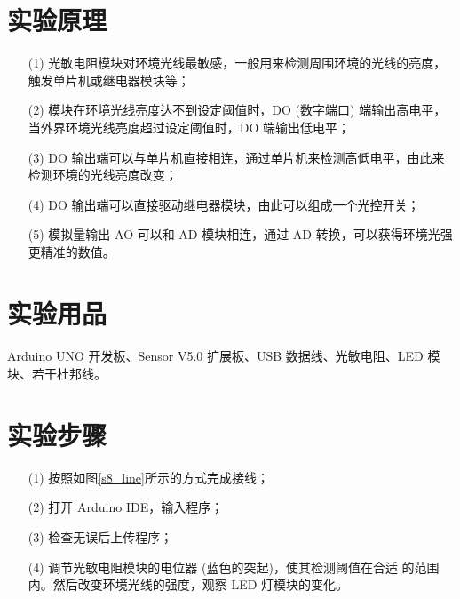 \documentclass[UTF8, oneside]{ctexbook}
\begin{document}
\section{实验原理}
\begin{itemize}
    \item[(1)] 光敏电阻模块对环境光线最敏感，一般用来检测周围环境的光线的亮度，触发单片机或继电器模块等；
    \item[(2)] 模块在环境光线亮度达不到设定阈值时，DO (数字端口) 端输出高电平，当外界环境光线亮度超过设定阈值时，DO 端输出低电平；
    \item[(3)] DO 输出端可以与单片机直接相连，通过单片机来检测高低电平，由此来检测环境的光线亮度改变；
    \item[(4)] DO 输出端可以直接驱动继电器模块，由此可以组成一个光控开关；
    \item[(5)] 模拟量输出 AO 可以和 AD 模块相连，通过 AD 转换，可以获得环境光强更精准的数值。
\end{itemize}


\section{实验用品}
\paragraph{}
Arduino UNO 开发板、Sensor V5.0 扩展板、USB 数据线、光敏电阻、LED 模块、若干杜邦线。

\section{实验步骤}
\begin{itemize}
    \item[(1)] 按照如图\ref{s8_line}所示的方式完成接线；
    \item[(2)] 打开 Arduino IDE，输入程序；
    \item[(3)] 检查无误后上传程序；
    \item[(4)] 调节光敏电阻模块的电位器 (蓝色的突起)，使其检测阈值在合适
    的范围内。然后改变环境光线的强度，观察 LED 灯模块的变化。
\end{itemize}
\end{document}
